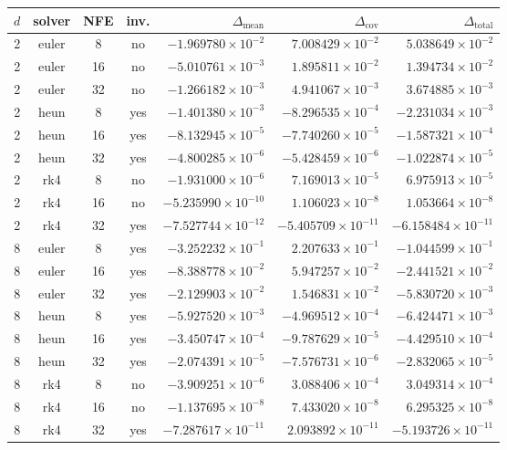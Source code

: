 \begin{tabular}{ccccrrr}
\toprule
$d$ & solver & NFE & inv. & $\Delta_{\mathrm{mean}}$ & $\Delta_{\mathrm{cov}}$ & $\Delta_{\mathrm{total}}$ \\
\midrule
2 & euler & 8 & no & $-1.969780\times 10^{-2}$ & $7.008429\times 10^{-2}$ & $5.038649\times 10^{-2}$ \\
2 & euler & 16 & no & $-5.010761\times 10^{-3}$ & $1.895811\times 10^{-2}$ & $1.394734\times 10^{-2}$ \\
2 & euler & 32 & no & $-1.266182\times 10^{-3}$ & $4.941067\times 10^{-3}$ & $3.674885\times 10^{-3}$ \\
2 & heun & 8 & yes & $-1.401380\times 10^{-3}$ & $-8.296535\times 10^{-4}$ & $-2.231034\times 10^{-3}$ \\
2 & heun & 16 & yes & $-8.132945\times 10^{-5}$ & $-7.740260\times 10^{-5}$ & $-1.587321\times 10^{-4}$ \\
2 & heun & 32 & yes & $-4.800285\times 10^{-6}$ & $-5.428459\times 10^{-6}$ & $-1.022874\times 10^{-5}$ \\
2 & rk4 & 8 & no & $-1.931000\times 10^{-6}$ & $7.169013\times 10^{-5}$ & $6.975913\times 10^{-5}$ \\
2 & rk4 & 16 & no & $-5.235990\times 10^{-10}$ & $1.106023\times 10^{-8}$ & $1.053664\times 10^{-8}$ \\
2 & rk4 & 32 & yes & $-7.527744\times 10^{-12}$ & $-5.405709\times 10^{-11}$ & $-6.158484\times 10^{-11}$ \\
8 & euler & 8 & yes & $-3.252232\times 10^{-1}$ & $2.207633\times 10^{-1}$ & $-1.044599\times 10^{-1}$ \\
8 & euler & 16 & yes & $-8.388778\times 10^{-2}$ & $5.947257\times 10^{-2}$ & $-2.441521\times 10^{-2}$ \\
8 & euler & 32 & yes & $-2.129903\times 10^{-2}$ & $1.546831\times 10^{-2}$ & $-5.830720\times 10^{-3}$ \\
8 & heun & 8 & yes & $-5.927520\times 10^{-3}$ & $-4.969512\times 10^{-4}$ & $-6.424471\times 10^{-3}$ \\
8 & heun & 16 & yes & $-3.450747\times 10^{-4}$ & $-9.787629\times 10^{-5}$ & $-4.429510\times 10^{-4}$ \\
8 & heun & 32 & yes & $-2.074391\times 10^{-5}$ & $-7.576731\times 10^{-6}$ & $-2.832065\times 10^{-5}$ \\
8 & rk4 & 8 & no & $-3.909251\times 10^{-6}$ & $3.088406\times 10^{-4}$ & $3.049314\times 10^{-4}$ \\
8 & rk4 & 16 & no & $-1.137695\times 10^{-8}$ & $7.433020\times 10^{-8}$ & $6.295325\times 10^{-8}$ \\
8 & rk4 & 32 & yes & $-7.287617\times 10^{-11}$ & $2.093892\times 10^{-11}$ & $-5.193726\times 10^{-11}$ \\
\bottomrule
\end{tabular}
